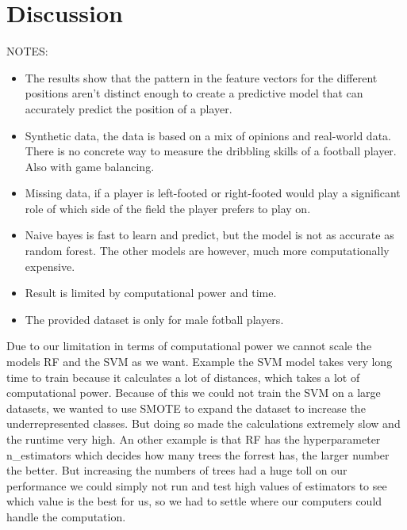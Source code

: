 \section{Discussion}

NOTES:
\begin{itemize}
    \item The results show that the pattern in the feature vectors for the different positions aren't distinct enough to create a predictive model that can accurately predict the position of a player.
    \item Synthetic data, the data is based on a mix of opinions and real-world data. There is no concrete way to measure the dribbling skills of a football player. Also with game balancing.
    \item Missing data, if a player is left-footed or right-footed would play a significant role of which side of the field the player prefers to play on.
    \item Naive bayes is fast to learn and predict, but the model is not as accurate as random forest. The other models are however, much more computationally expensive. 
    \item Result is limited by computational power and time.
    \item The provided dataset is only for male fotball players.
\end{itemize}


Due to our limitation in terms of computational power we cannot scale the models RF and the SVM as we want. 
Example the SVM model takes very long time to train because it calculates a lot of distances, which takes a lot of computational power. 
Because of this we could not train the SVM on a large datasets, we wanted to use SMOTE to expand the dataset to increase the underrepresented classes.
But doing so made the calculations extremely slow and the runtime very high. An other example is that RF has the hyperparameter n\_estimators which decides how many trees the forrest has, the larger number the better. 
But increasing the numbers of trees had a huge toll on our performance we could simply not run and test high values of estimators to see which value is the best for us, so we had to settle where our computers could handle the computation.



